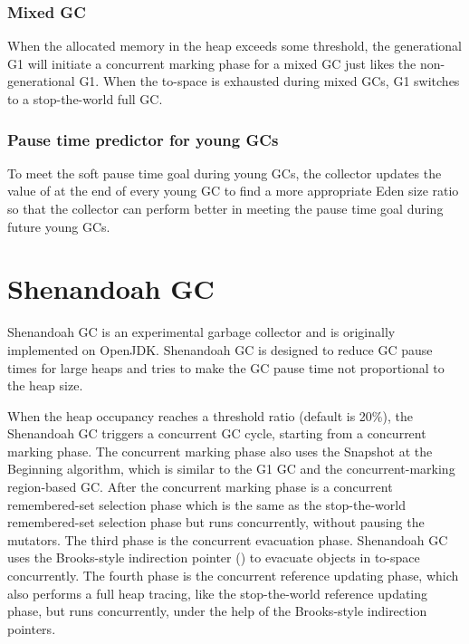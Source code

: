 \subsubsection{Mixed GC}

When the allocated memory in the heap exceeds some threshold, the generational G1 will
initiate a concurrent marking phase for a mixed GC just likes the non-generational G1.
When the to-space is exhausted during mixed GCs, G1 switches to a stop-the-world full GC.

\subsubsection{Pause time predictor for young GCs}

To meet the soft pause time goal during young GCs, the collector updates the value of 
at the end of every young GC to find a more appropriate Eden size ratio so that
the collector can perform better in meeting the pause time goal during future young GCs.
 
\section{Shenandoah GC}
\label{sec:shenandoahgc}

Shenandoah GC is an experimental garbage collector and is originally implemented on OpenJDK.
Shenandoah GC is designed to reduce GC pause times for large heaps and tries to make the GC pause
time not proportional to the heap size.
 
When the heap occupancy reaches a threshold ratio (default is 20\%), the Shenandoah GC triggers
a concurrent GC cycle, starting from a concurrent marking phase.
The concurrent marking phase also uses the Snapshot at the Beginning algorithm,
which is similar to the G1 GC and the concurrent-marking region-based GC.
After the concurrent marking phase is a concurrent remembered-set selection phase
which is the same as the stop-the-world remembered-set selection phase
but runs concurrently, without pausing the mutators.
The third phase is the concurrent evacuation phase. Shenandoah GC uses the Brooks-style
indirection pointer (\cite{flood2016shenandoah}) to evacuate objects in to-space
concurrently. The fourth phase is the concurrent reference updating phase, which
also performs a full heap tracing, like the stop-the-world reference updating phase,
but runs concurrently, under the help of the Brooks-style indirection pointers.

